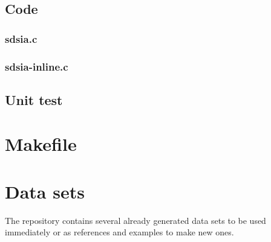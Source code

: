 \subsection{Code}

\subsubsection{sdsia.c}

\begin{scriptsize}
\begin{ttfamily}

\end{ttfamily}
\end{scriptsize}

\subsubsection{sdsia-inline.c}

\begin{scriptsize}
\begin{ttfamily}

\end{ttfamily}
\end{scriptsize}

\subsection{Unit test}

\begin{scriptsize}
\begin{ttfamily}

\end{ttfamily}
\end{scriptsize}

\section{Makefile}

\begin{scriptsize}
\begin{ttfamily}

\end{ttfamily}
\end{scriptsize}

\section{Data sets}

The repository contains several already generated data sets to be used immediately or as references and examples to make new ones.

